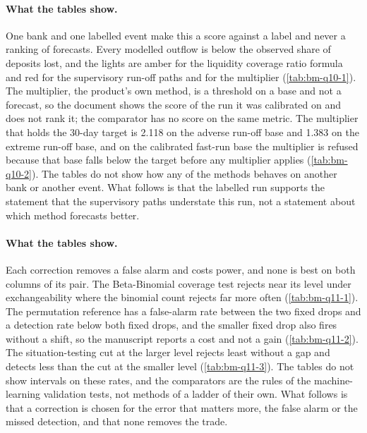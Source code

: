\paragraph{What the tables show.} One bank and one labelled event make this a score against a label and never a ranking of forecasts. Every modelled outflow is below the observed share of deposits lost, and the lights are amber for the liquidity coverage ratio formula and red for the supervisory run-off paths and for the multiplier (\cref{tab:bm-q10-1}). The multiplier, the product's own method, is a threshold on a base and not a forecast, so the document shows the score of the run it was calibrated on and does not rank it; the comparator has no score on the same metric. The multiplier that holds the 30-day target is 2.118 on the adverse run-off base and 1.383 on the extreme run-off base, and on the calibrated fast-run base the multiplier is refused because that base falls below the target before any multiplier applies (\cref{tab:bm-q10-2}). The tables do not show how any of the methods behaves on another bank or another event. What follows is that the labelled run supports the statement that the supervisory paths understate this run, not a statement about which method forecasts better.



\paragraph{What the tables show.} Each correction removes a false alarm and costs power, and none is best on both columns of its pair. The Beta-Binomial coverage test rejects near its level under exchangeability where the binomial count rejects far more often (\cref{tab:bm-q11-1}). The permutation reference has a false-alarm rate between the two fixed drops and a detection rate below both fixed drops, and the smaller fixed drop also fires without a shift, so the manuscript reports a cost and not a gain (\cref{tab:bm-q11-2}). The situation-testing cut at the larger level rejects least without a gap and detects less than the cut at the smaller level (\cref{tab:bm-q11-3}). The tables do not show intervals on these rates, and the comparators are the rules of the machine-learning validation tests, not methods of a ladder of their own. What follows is that a correction is chosen for the error that matters more, the false alarm or the missed detection, and that none removes the trade.



